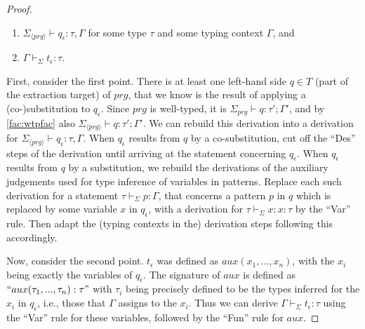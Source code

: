 \begin{lemma}
\begin{proof}
\begin{enumerate}
\item $\Sigma_{\langle prg \rangle} \vdash q_\epsilon : \tau, \Gamma$ for some type $\tau$ and some typing context $\Gamma$, and

\item $\Gamma \vdash_{\Sigma} t_\epsilon : \tau$.
\end{enumerate}
First, consider the first point. There is at least one left-hand side $q \in T$ (part of the extraction target) of $prg$, that we know is the result of applying a (co-)substitution to $q_\epsilon$. Since $prg$ is well-typed, it is $\Sigma_{prg} \vdash q : \tau'; \Gamma'$, and by \autoref{fac:wtpfac} also $\Sigma_{\langle prg \rangle} \vdash q : \tau'; \Gamma'$. We can rebuild this derivation into a derivation for $\Sigma_{\langle prg \rangle} \vdash q_\epsilon : \tau, \Gamma$. When $q_\epsilon$ results from $q$ by a co-substitution, cut off the ``Des'' steps of the derivation until arriving at the statement concerning $q_\epsilon$. When $q_\epsilon$ results from $q$ by a substitution, we rebuild the derivations of the auxiliary judgements used for type inference of variables in patterns. Replace each such derivation for a statement $\tau \vdash_{\Sigma} p : \Gamma$, that concerns a pattern $p$ in $q$ which is replaced by some variable $x$ in $q_\epsilon$, with a derivation for $\tau \vdash_{\Sigma} x : x:\tau$ by the ``Var'' rule. Then adapt the (typing contexts in the) derivation steps following this accordingly.

Now, consider the second point. $t_\epsilon$ was defined as $aux(x_1, ..., x_n)$, with the $x_i$ being exactly the variables of $q_\epsilon$. The signature of $aux$ is defined as $`` aux(\tau_1, ..., \tau_n): \tau "$ with $\tau_i$ being precisely defined to be the types inferred for the $x_i$ in $q_\epsilon$, i.e., those that $\Gamma$ assigns to the $x_i$. Thus we can derive $\Gamma \vdash_{\Sigma} t_\epsilon : \tau$ using the ``Var'' rule for these variables, followed by the ``Fun'' rule for $aux$.
\end{proof}
\end{lemma}

